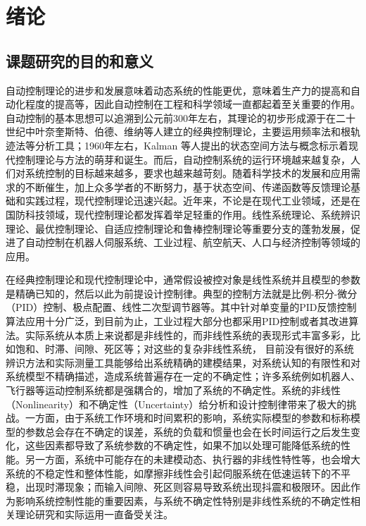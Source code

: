 \chapter{绪论}\label{chap:intro}
\section{课题研究的目的和意义}\label{sect:1.1}

自动控制理论的进步和发展意味着动态系统的性能更优，意味着生产力的提高和自动化程度的提高等，因此自动控制在工程和科学领域一直都起着至关重要的作用。自动控制的基本思想可以追溯到公元前300年左右，其理论的初步形成源于在二十世纪中叶奈奎斯特、伯德、维纳等人建立的经典控制理论，主要运用频率法和根轨迹法等分析工具；1960年左右，Kalman 等人提出的状态空间方法与概念标示着现代控制理论与方法的萌芽和诞生。而后，自动控制系统的运行环境越来越复杂，人们对系统控制的目标越来越多，要求也越来越苛刻。随着科学技术的发展和应用需求的不断催生，加上众多学者的不断努力，基于状态空间、传递函数等反馈理论基础和实践过程，现代控制理论迅速兴起。近年来，不论是在现代工业领域，还是在国防科技领域，现代控制理论都发挥着举足轻重的作用。线性系统理论、系统辨识理论、最优控制理论、自适应控制理论和鲁棒控制理论等重要分支的蓬勃发展，促进了自动控制在机器人伺服系统、工业过程、航空航天、人口与经济控制等领域的应用。

在经典控制理论和现代控制理论中，通常假设被控对象是线性系统并且模型的参数是精确已知的，然后以此为前提设计控制律。典型的控制方法就是比例-积分-微分（PID）控制、极点配置、线性二次型调节器等。其中针对单变量的PID反馈控制算法应用十分广泛，到目前为止，工业过程大部分也都采用PID控制或者其改进算法。实际系统从本质上来说都是非线性的，而非线性系统的表现形式丰富多彩，比如饱和、时滞、间隙、死区等；对这些的复杂非线性系统， 目前没有很好的系统辨识方法和实际测量工具能够给出系统精确的建模结果，对系统认知的有限性和对系统模型不精确描述，造成系统普遍存在一定的不确定性；许多系统例如机器人、飞行器等运动控制系统都是强耦合的，增加了系统的不确定性。系统的非线性（Nonlinearity）和不确定性（Uncertainty）给分析和设计控制律带来了极大的挑战。一方面，由于系统工作环境和时间累积的影响，系统实际模型的参数和标称模型的参数总会存在不确定的误差，系统的负载和惯量也会在长时间运行之后发生变化，这些因素都导致了系统参数的不确定性，如果不加以处理可能降低系统的性能。另一方面，系统中可能存在的未建模动态、执行器的非线性特性等，也会增大系统的不稳定性和整体性能，如摩擦非线性会引起伺服系统在低速运转下的不平稳，出现时滞现象；而输入间隙、死区则容易导致系统出现抖震和极限环。因此作为影响系统控制性能的重要因素，与系统不确定性特别是非线性系统的不确定性相关理论研究和实际运用一直备受关注。

